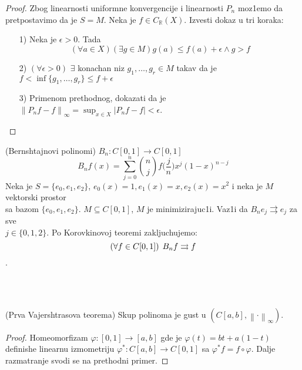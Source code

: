 \documentclass[a4paper,12pt]{article}
\newcommand{\RR}{\mathbb{R}}
\newcommand{\psj}{\subseteq}
\newcommand{\norm}[1]{\left\lVert#1\right\rVert}
\begin{document}
\begin{proof}
Zbog linearnosti uniformne konvergencije i linearnosti $P_n$ moz1emo da pretpo\-stavimo da je $S = M$.  Neka je $f \in C_{\RR}(X)$. Izvesti dokaz u tri koraka:
\begin{itemize}
\item[1)] Neka je $\epsilon >0$. Tada 
\[(\forall a \in X)(\exists g \in M) g(a) \leq f(a) + \epsilon \wedge g > f\]
\item[2)] $(\forall \epsilon > 0)$ $\exists$ konachan niz $g_1, \dots, g_r \in M$ takav da je $f < \inf \{g_1, \dots, g_r \} \leq f + \epsilon $
\item[3)] Primenom prethodnog, dokazati da je $\norm{P_n f - f}_{\infty} = \sup_{x \in X} |P_nf - f|<\epsilon$.
\end{itemize}
\end{proof}

\begin{pr}
(Bernshtajnovi polinomi)
$B_n: C[0,1] \to C[0,1]$
\[B_n f(x) = \sum_{j=0}^n {{n}\choose{j}} f\bigg(\frac{j}{n}\bigg) x^j {(1-x)}^{n-j}\]
Neka je $S = \{e_0, e_1, e_2 \}$, $e_0(x) = 1, e_1(x) = x, e_2(x) = x^2$ i neka je $M$ vektorski prostor\\ sa bazom $\{e_0,e_1,e_2\}$. $M \psj C[0,1]$, $M$ je minimizirajuc1i. Vaz1i da $B_n e_j \rightrightarrows e_j$ za sve \\$j \in \{0,1,2\}$. Po Korovkinovoj teoremi zakljuchujemo: \[(\forall f \in C[0,1])\hspace{0.15cm} B_n f \rightrightarrows f \].
\end{pr}
\\ \\
\begin{posl}
(Prva Vajershtrasova teorema) Skup polinoma je gust u $(C[a,b], \norm{\cdot}_{\infty})$.
\end{posl}
\begin{proof}
Homeomorfizam $\varphi:[0,1] \to [a,b]$ gde je $\varphi(t) = bt + a(1-t)$ definishe linearnu izmometriju $\varphi^*: C[a,b] \to C[0,1]$ sa $\varphi^* f = f \circ \varphi$. Dalje razmatranje svodi se na prethodni primer.
\end{proof}
\end{document}
